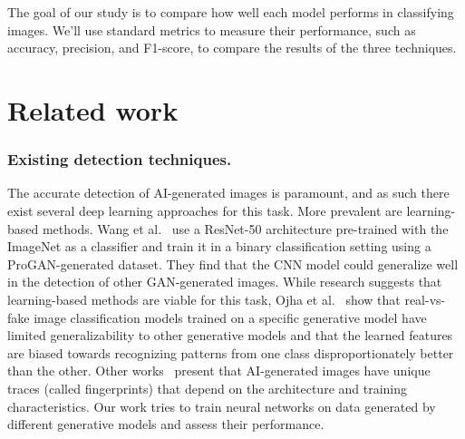 \documentclass[runningheads]{llncs}
\begin{document}
The goal of our study is to compare how well each model performs in classifying images. We'll use standard metrics to measure their performance, such as accuracy, precision, and F1-score, to compare the results of the three techniques. 
%
%
\section{Related work}

\subsubsection{Existing detection techniques.} The accurate detection of AI-generated images is paramount, and as such there exist several deep learning approaches for this task. More prevalent are learning-based methods. Wang et al.~\cite{wang2019cnngenerated} use a ResNet-50 architecture pre-trained with the ImageNet as a classifier and train it in a binary classification setting using a ProGAN-generated dataset. They find that the CNN model could generalize well in the detection of other GAN-generated images. While research suggests that learning-based methods are viable for this task, Ojha et al.~\cite{ojha2023towards} show that real-vs-fake image classification models trained on a specific generative model have limited generalizability to other generative models and that the learned features are biased towards recognizing patterns from one class disproportionately better than the other. Other works~\cite{francesco2019fingerprint, ning2019fingerprint} present that AI-generated images have unique traces (called fingerprints) that depend on the architecture and training characteristics. Our work tries to train neural networks on data generated by different generative models and assess their performance.
\end{document}
